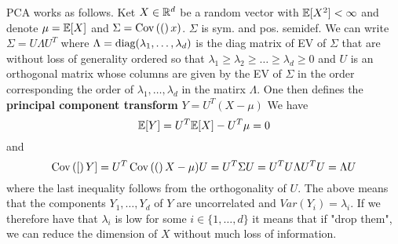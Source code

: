 PCA works as follows. Ket $X\in\mathbb{R}^d$ be a random vector with $\mathbb{E}[X^2] < \infty$ and denote $\mu = \mathbb{E}[X]$ and $\Sigma = \operatorname{Cov}\left(( \right)x)$. $\Sigma$ is sym. and pos. semidef. We can write $\Sigma = U \Lambda U^T$ where $\Lambda = \text{diag}(\lambda_1,\dots,\lambda_d)$ is the diag matrix of EV of $\Sigma$ that are without loss of generality ordered so that $\lambda_1 \geq \lambda_2 \geq \dots \geq \lambda_d \geq 0$ and $U$ is an orthogonal  matrix whose columns are given by the EV of $\Sigma$ in the order corresponding the order of $\lambda_1, \dots, \lambda_d$ in the matirx $\Lambda$. One then defines the \textbf{principal component transform} $Y = U^T(X  - \mu)$ We have 
\[
\mathbb{E}[Y] = U^T\mathbb{E}[X] - U^T\mu = 0
\]
and
\[
\operatorname{Cov}\left([ \right)Y] = U^T\operatorname{Cov}\left(( \right)X-\mu)U = U^T\Sigma U = U^TU\Lambda U^TU = \Lambda U
\]
where the last inequality follows from the orthogonality of $U$. The above means that the components $Y_1, \dots ,Y_d$ of $Y$ are uncorrelated and $Var(Y_i) = \lambda_i$. If we therefore have that $\lambda_i$ is low for some $i \in \{1,\dots,d\}$ it means that if "drop them", we can reduce the dimension of $X$ without much loss of information.